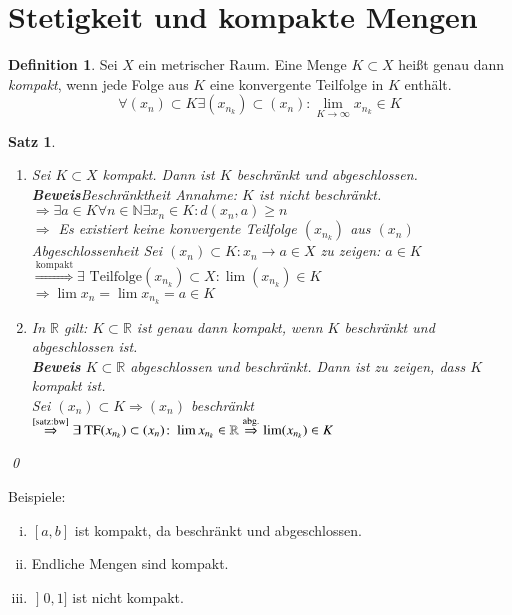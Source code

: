 \documentclass[ngerman,titlepage,twoside, parskip=half*]{scrreprt}
\newcommand*{\N}{\mathbb{N}}
\newcommand*{\R}{\mathbb{R}}
\theoremstyle{plain}
\newtheorem{theorem}{Satz}[section]
\theoremstyle{definition}
\newtheorem{definition}{Definition}
\theoremstyle{remark}
\newcommand*{\lsofint}[1]{\mathopen{]}#1]}   %
\begin{document}
\section{Stetigkeit und kompakte Mengen}
\begin{definition}
Sei $X$ ein metrischer Raum. Eine Menge $K\subset X$ heißt genau dann \emph{kompakt},
wenn jede Folge aus $K$ eine konvergente Teilfolge in $K$ enthält.
\[\forall (x_n) \subset K \exists (x_{n_k})\subset (x_n)\colon\lim_{K\rightarrow \infty} x_{n_k}\in K\]
\end{definition}

\begin{theorem}
\label{satz:beschr-abg}
\begin{enumerate}[(1)]
  \item Sei $K\subset X$ kompakt. Dann ist $K$ beschränkt und abgeschlossen.\\
    \textbf{Beweis}\textit{Beschränktheit} Annahme: $K$ ist nicht beschränkt.\\
    $\Rightarrow \exists a \in K \forall n \in \N \exists x_n \in K\colon d(x_n,a)\geq n$\\
    $\Rightarrow$ Es existiert keine konvergente Teilfolge $(x_{n_k})$ aus $(x_n)$\textnormal{\lightning}\\
    \textit{Abgeschlossenheit} Sei $(x_n)\subset K \colon x_n \rightarrow a\in X$ zu zeigen: $a\in K$\\
    $\stackrel{\text{kompakt}}{\Rightarrow} \exists \text{ Teilfolge} (x_{n_k})\subset X \colon\lim (x_{n_k})\in K$\\
    $\Rightarrow \lim x_n=\lim x_{n_k}=a\in K$
  \item In $\R$ gilt: $K\subset \R$ ist genau dann kompakt, wenn $K$ beschränkt und abgeschlossen ist.\\
    \textbf{Beweis} $K\subset \R$ abgeschlossen und beschränkt. Dann ist zu zeigen, dass $K$ kompakt ist.\\
    Sei $(x_n)\subset K \Rightarrow (x_n)$ beschränkt $\stackrel{\text{\autoref{satz:bw}}}{\Rightarrow}
    \exists \text{ TF} (x_{n_k})\subset (x_n)\colon \lim x_{n_k}\in\R\stackrel{\text{abg.}}{\Rightarrow}
    \lim (x_{n_k})\in K$
\end{enumerate}
\qed
\end{theorem}

Beispiele:
\begin{enumerate}[(i)]
  \item $[a,b]$ ist kompakt, da beschränkt und abgeschlossen.
  \item Endliche Mengen sind kompakt.
  \item $\lsofint{0,1}$ ist nicht kompakt.
\end{enumerate}
\end{document}
